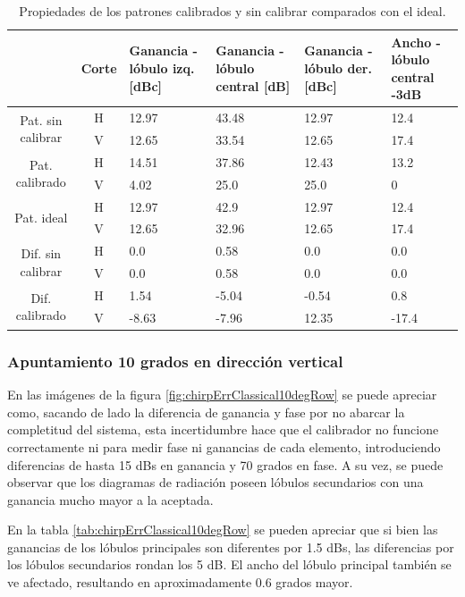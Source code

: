 \begin{table}[H]
  \footnotesize
  \centering
  \begin{tabular}{|c|c|p{2cm}|p{2.5cm}|p{2.5cm}|p{2.5cm}|}
    \cline{2-6}
    \multicolumn{1}{c|}{} & Corte & Ganancia - lóbulo izq. [dBc] & Ganancia - lóbulo central [dB] &
    Ganancia - lóbulo der. [dBc] & Ancho - lóbulo central -3dB \tabularnewline\hline
    \multirow{2}{2cm}{Pat. sin calibrar} & H & 12.97 & 43.48 & 12.97 & 12.4 \tabularnewline\cline{2-6}
     & V & 12.65 & 33.54 & 12.65 & 17.4 \tabularnewline\hline
    \multirow{2}{2cm}{Pat. calibrado} & H & 14.51 & 37.86 & 12.43 & 13.2 \tabularnewline\cline{2-6}
     & V & 4.02 & 25.0 & 25.0 & 0 \tabularnewline\hline
    \multirow{2}{2cm}{Pat. ideal} & H & 12.97 & 42.9 & 12.97 & 12.4 \tabularnewline\cline{2-6}
     & V & 12.65 & 32.96 & 12.65 & 17.4 \tabularnewline\hline
    \multirow{2}{2cm}{Dif. sin calibrar} & H & 0.0 & 0.58 & 0.0 & 0.0\tabularnewline\cline{2-6}
     & V & 0.0 & 0.58 & 0.0 & 0.0 \tabularnewline\hline
    \multirow{2}{2cm}{Dif. calibrado} & H & 1.54 & -5.04 & -0.54 & 0.8 \tabularnewline\cline{2-6}
     & V & -8.63 & -7.96 & 12.35 & -17.4 \tabularnewline\hline
  \end{tabular}
  \caption{Propiedades de los patrones calibrados y sin calibrar comparados con el ideal.}
  \label{tab:chirpErrClassical10degCol}
\end{table}


\subsubsection{Apuntamiento 10 grados en dirección vertical}

En las imágenes de la figura \ref{fig:chirpErrClassical10degRow} se puede apreciar como, sacando de lado la diferencia de 
ganancia y fase por no abarcar la completitud del sistema, esta incertidumbre hace que el calibrador no funcione correctamente 
ni para medir fase ni ganancias de cada elemento, introduciendo diferencias de hasta 15 dBs en ganancia y 70 grados en fase. 
A su vez, se puede observar que los diagramas de radiación poseen lóbulos secundarios con una ganancia mucho mayor a la aceptada.

En la tabla \ref{tab:chirpErrClassical10degRow} se pueden apreciar que si bien las ganancias de los lóbulos principales son 
diferentes por 1.5 dBs, las diferencias por los lóbulos secundarios rondan los 5 dB. El ancho del lóbulo principal también 
se ve afectado, resultando en aproximadamente 0.6 grados mayor.

